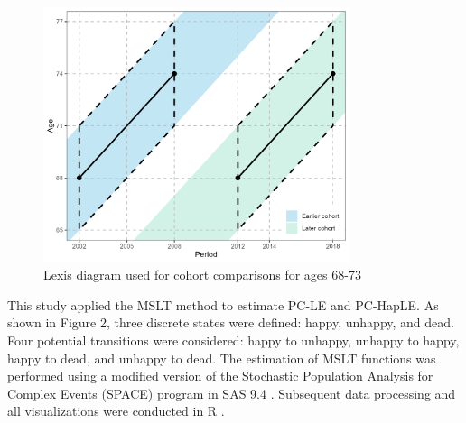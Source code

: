 \documentclass[12pt, a4paper]{article}
\begin{document}
\begin{figure}[htbp]
  \centering
  \includegraphics[width=0.8\textwidth]{fig_tabs_b300/2_1_Lexis_Diagram.png}
  \caption{Lexis diagram used for cohort comparisons for ages 68-73}
  \label{fig:Lexis_Diagram}
\end{figure}

This study applied the MSLT method to estimate PC-LE and PC-HapLE. As shown in Figure 2, three discrete states were defined: happy, unhappy, and dead. Four potential transitions were considered: happy to unhappy, unhappy to happy, happy to dead, and unhappy to dead. The estimation of MSLT functions was performed using a modified version of the Stochastic Population Analysis for Complex Events (SPACE) program \autocite{cai.2010.estimation} in SAS 9.4 \autocite{sasinstituteinc..2016.sas}. Subsequent data processing and all visualizations were conducted in R \autocite{rcoreteam.2023.language}.
\end{document}
